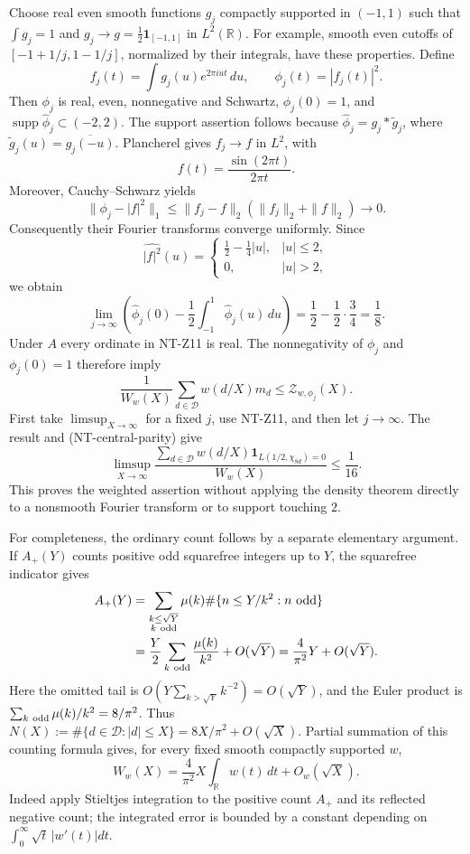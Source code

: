 Choose real even smooth functions $g_j$ compactly supported in $(-1,1)$
such that $\int g_j=1$ and
$g_j\to g=\tfrac12\mathbf1_{[-1,1]}$ in $L^2(\mathbb R)$.
For example, smooth even cutoffs of $[-1+1/j,1-1/j]$, normalized by
their integrals, have these properties.  Define
\[
 f_j(t)=\int g_j(u)e^{2\pi iut}\,du,\qquad
 \phi_j(t)=|f_j(t)|^2.
\]
Then $\phi_j$ is real, even, nonnegative and Schwartz,
$\phi_j(0)=1$, and
$\operatorname{supp}\widehat\phi_j\subset(-2,2)$.
The support assertion follows because
$\widehat\phi_j=g_j*\widetilde g_j$, where
$\widetilde g_j(u)=\overline{g_j(-u)}$.
Plancherel gives $f_j\to f$ in $L^2$, with
\[
 f(t)=\frac{\sin(2\pi t)}{2\pi t}.
\]
Moreover, Cauchy--Schwarz yields
\[
 \|\phi_j-|f|^2\|_1
 \le\|f_j-f\|_2(\|f_j\|_2+\|f\|_2)\longrightarrow0.
\]
Consequently their Fourier transforms converge uniformly.  Since
\[
 \widehat{|f|^2}(u)=
 \begin{cases}\tfrac12-\tfrac14|u|,&|u|\le2,\\0,&|u|>2,
 \end{cases}
\]
we obtain
\[
 \lim_{j\to\infty}
 \left(\widehat\phi_j(0)-\frac12
                   \int_{-1}^1\widehat\phi_j(u)\,du\right)
 =\frac12-\frac12\cdot\frac34=\frac18.
\tag{NT-test-limit}
\]
Under $A$ every ordinate in NT-Z11 is real.  The nonnegativity of
$\phi_j$ and $\phi_j(0)=1$ therefore imply
\[
 \frac1{W_w(X)}\sum_{d\in\mathcal D}w(d/X)m_d
 \le\mathcal Z_{w,\phi_j}(X).
\]
First take $\limsup_{X\to\infty}$ for a fixed $j$, use NT-Z11, and
then let $j\to\infty$.  The result and (NT-central-parity) give
\[
 \limsup_{X\to\infty}
 \frac{\sum_{d\in\mathcal D}w(d/X)
               \mathbf1_{L(1/2,\chi_{8d})=0}}{W_w(X)}\le\frac1{16}.
\tag{NT-weighted-vanishing}
\]
This proves the weighted assertion without applying the density theorem
directly to a nonsmooth Fourier transform or to support touching $2$.

For completeness, the ordinary count follows by a separate elementary
argument.  If $A_+(Y)$ counts positive odd squarefree integers up to $Y$,
the squarefree indicator gives
\begin{align*}
 A_+(Y)&=\sum_{\substack{k\le\sqrt Y\\k\ {\rm odd}}}\mu(k)
       \#\{n\le Y/k^2:n\ {\rm odd}\}\\
 &=\frac Y2\sum_{k\ {\rm odd}}\frac{\mu(k)}{k^2}+O(\sqrt Y)
 =\frac4{\pi^2}Y+O(\sqrt Y).
\end{align*}
Here the omitted tail is $O(Y\sum_{k>\sqrt Y}k^{-2})=O(\sqrt Y)$,
and the Euler product is
$\sum_{k\ {\rm odd}}\mu(k)/k^2=8/\pi^2$.
Thus $N(X):=\#\{d\in\mathcal D:|d|\le X\}
 =8X/\pi^2+O(\sqrt X)$.
Partial summation of this counting formula gives, for every fixed
smooth compactly supported $w$,
\[
 W_w(X)=\frac4{\pi^2}X\int_{\mathbb R}w(t)\,dt+O_w(\sqrt X).
\]
Indeed apply Stieltjes integration to the positive count $A_+$ and
its reflected negative count; the integrated error is bounded by a
constant depending on $\int_0^\infty\sqrt t\,|w'(t)|dt$.

